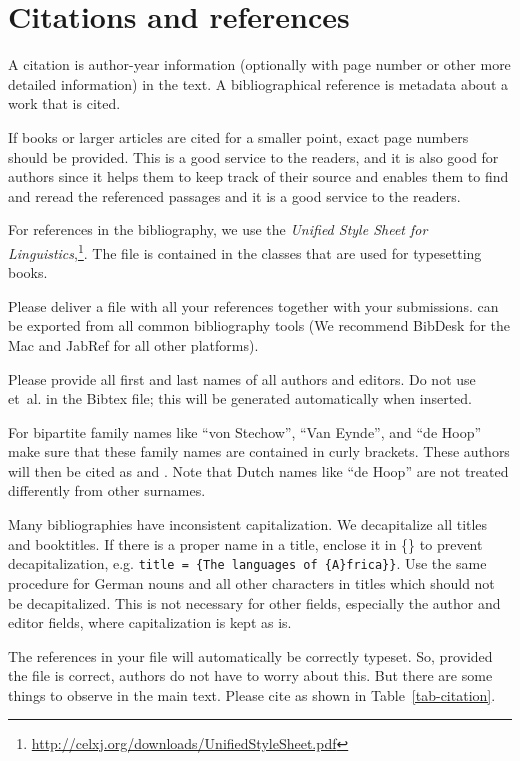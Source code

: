 {\section{Citations and references}
\label{sec-references-authors}

A citation is author-year information (optionally with page number or other more detailed information) in the text. A bibliographical reference is metadata about a work that is cited.

If books or larger articles are cited for a smaller point, exact page numbers should be provided. This is a good service to the readers, and it is also good for
authors since it helps them to keep track of their source and enables them to find and reread the
referenced passages and it is a good service to the readers.

For references in the bibliography, we use the \emph{Unified Style Sheet for Linguistics},\footnote{\url{http://celxj.org/downloads/UnifiedStyleSheet.pdf}}. The \bibtex file is contained in the \latex
classes that are used for typesetting \lsp books. 

Please deliver a \bibtex file with all your references together with your submissions. 
\bibtex can be exported from all common bibliography tools (We recommend BibDesk for the Mac and JabRef for all other platforms). 

Please provide all first and last names of all authors and editors. Do not use et~al. in the Bibtex file; this will be generated automatically when inserted.

For bipartite family names like ``von Stechow'', ``Van Eynde'', and ``de Hoop'' make sure that these
family names are contained in curly brackets. These authors will then be cited as
\citet{VanEynde2006a} and \citet{vonStechow84a}. Note that Dutch names like ``de Hoop'' are not treated differently from other surnames.

Many bibliographies have inconsistent capitalization. We decapitalize all titles and booktitles. If there is a proper name in a title, enclose it in \{\} to prevent decapitalization, e.g. \texttt{title = \{The languages of \{A\}frica\}\}}. Use the same procedure for German nouns and all other characters in titles which should not be decapitalized. This is not necessary for other fields, especially the author and editor fields, where capitalization is kept as is.

The references in your \bibtex file will automatically be correctly typeset. So, provided the
\bibtex file is correct, authors do not have to worry about this. But there are some things to
observe in the main text. Please cite as shown in Table~\ref{tab-citation}.

}
